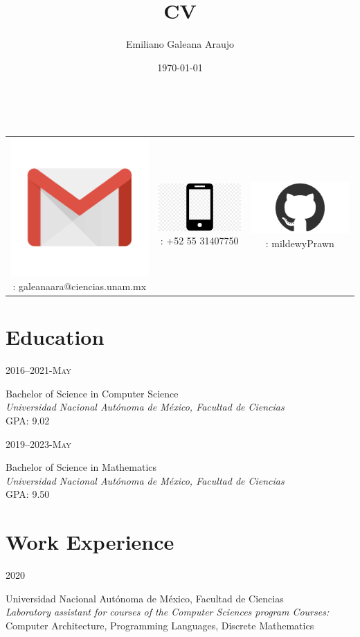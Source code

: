 \documentclass{article}
\renewcommand{\maketitle}{
  \begin{center}
    {\huge\bfseries
      \theauthor}
    \vspace{.25em}\\
\end{center}
}
\newcommand{\UNAM}{Universidad Nacional Aut\'onoma de M\'exico, }
\newcommand{\FC}{Facultad de Ciencias}
\newcommand{\entry}[4]{  
  \begin{minipage}[t]{.15\textwidth}
    \hfill \textsc{#1}\\
  \end{minipage}
  \hfill\vline\hfill
  \begin{minipage}[t]{.80\textwidth}
    #2\\
    \textit{#3}\\
    \footnotesize{#4}
  \end{minipage}
}
\newcommand{\gh}
           {
             \includegraphics[scale=.05]{../imagenes/github.png}
           }
\newcommand{\email}
           {
             \includegraphics[scale=.07]{../imagenes/gmail.png}
           }
\newcommand{\phone}
           {
             \includegraphics[scale=.03]{../imagenes/phone.jpg}
           }
\begin{document}


\title{CV}
\author{Emiliano Galeana Araujo}
\date{\today}

\maketitle

\begin{table}[H]
  \centering
  \begin{tabular}{ c  c  c }
    \email : galeanaara@ciencias.unam.mx & \phone : +52 55 31407750 & \gh{} : mildewyPrawn\\
  \end{tabular}
\end{table}

\section{Education}
\entry{2016--2021-May}
      {Bachelor of Science in Computer Science}
      {\UNAM\FC}
      {GPA: 9.02}

\entry{2019--2023-May}
      {Bachelor of Science in Mathematics}
      {\UNAM\FC}
      {GPA: 9.50}

\section{Work Experience}
\entry{2020}
      {\UNAM\FC}
      {Laboratory assistant for courses of the Computer Sciences program Courses:}
      {Computer Architecture, Programming Languages, Discrete Mathematics}
\end{document}
